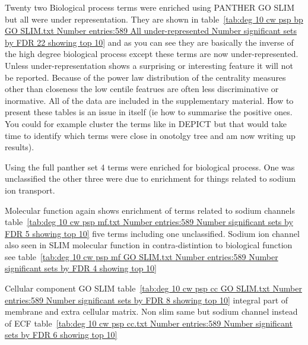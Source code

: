  Twenty two Biological process terms were enriched using PANTHER GO SLIM but all were under representation.
 They are shown in table~\ref{tab:deg 10 cw psp bp GO SLIM.txt Number entries:589 All under-represented Number significant sets by FDR 22 showing top 10} and as you can see they are basically the inverse of the high degree biological process except these terms are now under-represented. Unless under-representation shows a surprising or interesting feature it will not be reported. Because of the power law distribution of the centrality measures other than closeness the low centile featrues are often less discriminative or inormative. All of the data are included in the supplementary material. How to present these tables is an issue in itself (ie how to summarise the positive ones. You could for example cluster the terms like in DEPICT but that would take time to identify which terms were close in onotolgy tree and am now writing up results). 
 
 Using the full panther set 4 terms were enriched for biological process. One was unclassified the other three were due to enrichment for things related to sodium ion transport.
 
 Molecular function again shows enrichment of terms related to sodium channels table~\ref{tab:deg 10 cw psp mf.txt Number entries:589 Number significant sets by FDR 5 showing top 10} five terms including one unclassified. Sodium ion channel also seen in SLIM molecular function in contra-distintion to biological function see table~\ref{tab:deg 10 cw psp mf GO SLIM.txt Number entries:589 Number significant sets by FDR 4 showing top 10}
 
 Cellular component GO SLIM table~\ref{tab:deg 10 cw psp cc GO SLIM.txt Number entries:589 Number significant sets by FDR 8 showing top 10} integral part of membrane and extra cellular matrix. Non slim same but sodium channel instead of ECF table~\ref{tab:deg 10 cw psp cc.txt Number entries:589 Number significant sets by FDR 6 showing top 10} %
 

